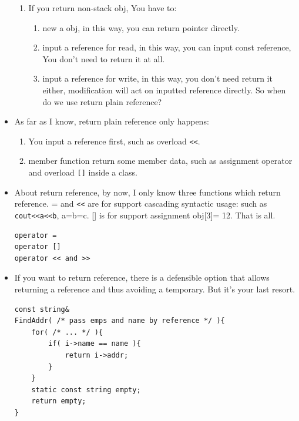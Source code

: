 \documentclass[a4paper,11pt,twoside]{book}
\begin{document}
\begin{itemize}
\begin{enumerate}
	\item If you return non-stack obj, You have to:
		\begin{enumerate}
			\item new a obj, in this way, you can return pointer directly.
			\item input a reference for read, in this way, you can input const reference, You don't need to return it at all.
			\item input a reference for write, in this way, you don't need return it either, modification will act on inputted reference directly. So when do we use return plain reference?
		\end{enumerate}
	
	\end{enumerate}
	
	\item As far as I know, return plain reference only happens:
	\begin{enumerate}
		\item You input a reference first, such as overload \verb=<<=.
		\item member function return some member data, such as  assignment operator and overload \verb=[]= inside a class.
	\end{enumerate}
	
	\item About return reference, by now, I only know three functions which return reference. = and \verb=<<= are for support cascading syntactic usage: such as \texttt{cout<<a<<b}, a=b=c.  [] is for support assignment obj[3]= 12.  That is all.
\begin{lstlisting}[numbers=none]
operator =
operator []
operator << and >>
\end{lstlisting}
	
	\item If you want to return reference,  there is a defensible option that allows returning a reference and thus avoiding a temporary. But it's your last resort.
\begin{lstlisting}[numbers=none]
const string&
FindAddr( /* pass emps and name by reference */ ){
	for( /* ... */ ){
		if( i->name == name ){
			return i->addr;
		}
	}
	static const string empty;
	return empty;
}
\end{lstlisting}
	
	
\end{itemize}
\end{document}
